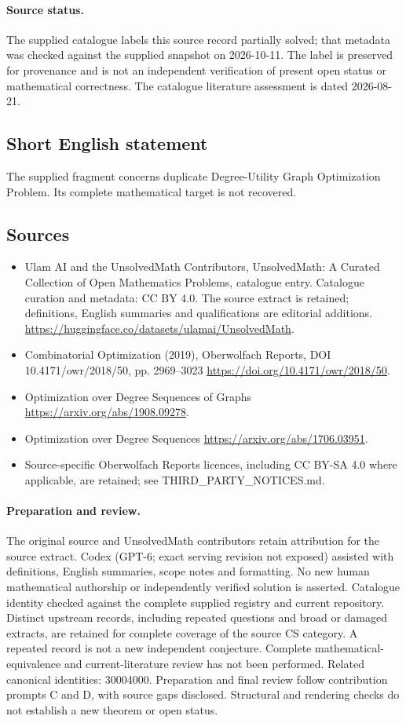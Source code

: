 \documentclass[11pt]{article}
\begin{document}
\paragraph{Source status.}
The supplied catalogue labels this source record partially solved; that metadata was checked against the supplied snapshot on 2026-10-11. The label is preserved for provenance and is not an independent verification of present open status or mathematical correctness. The catalogue literature assessment is dated 2026-08-21.
\subsection{Short English statement}
The supplied fragment concerns duplicate Degree-Utility Graph Optimization Problem. Its complete mathematical target is not recovered.
\subsection{Sources}
\begin{itemize}
\item[\hypertarget{source:statement:1}{S1}] Ulam AI and the UnsolvedMath Contributors, UnsolvedMath: A Curated Collection of Open Mathematics Problems, catalogue entry. Catalogue curation and metadata: CC BY 4.0. The source extract is retained; definitions, English summaries and qualifications are editorial additions.
\url{https://huggingface.co/datasets/ulamai/UnsolvedMath}.
\item[\hypertarget{source:statement:2}{S2}] Combinatorial Optimization (2019), Oberwolfach Reports, DOI 10.4171/owr/2018/50, pp. 2969--3023
\url{https://doi.org/10.4171/owr/2018/50}.
\item[\hypertarget{source:statement:3}{S3}] Optimization over Degree Sequences of Graphs
\url{https://arxiv.org/abs/1908.09278}.
\item[\hypertarget{source:statement:4}{S4}] Optimization over Degree Sequences
\url{https://arxiv.org/abs/1706.03951}.
\item Source-specific Oberwolfach Reports licences, including CC BY-SA 4.0 where applicable, are retained; see THIRD\_PARTY\_NOTICES.md.
\end{itemize}
\paragraph{Preparation and review.}
The original source and UnsolvedMath contributors retain attribution for the source extract. Codex (GPT-6; exact serving revision not exposed) assisted with definitions, English summaries, scope notes and formatting. No new human mathematical authorship or independently verified solution is asserted. Catalogue identity checked against the complete supplied registry and current repository. Distinct upstream records, including repeated questions and broad or damaged extracts, are retained for complete coverage of the source CS category. A repeated record is not a new independent conjecture. Complete mathematical-equivalence and current-literature review has not been performed. Related canonical identities: 30004000. Preparation and final review follow contribution prompts C and D, with source gaps disclosed. Structural and rendering checks do not establish a new theorem or open status.
\label{end:statement}
\end{document}
